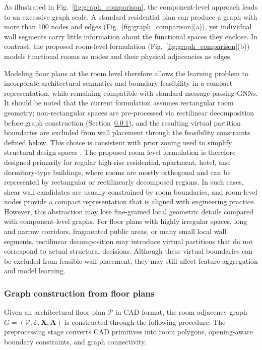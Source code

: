 As illustrated in Fig.~\ref{fig:graph_comparison}, the component-level approach leads to an excessive graph scale. A standard residential plan can produce a graph with more than 100 nodes and edges (Fig.~\ref{fig:graph_comparison}(a)), yet individual wall segments carry little information about the functional spaces they enclose. In contrast, the proposed room-level formulation (Fig.~\ref{fig:graph_comparison}(b)) models functional rooms as nodes and their physical adjacencies as edges.

Modeling floor plans at the room level therefore allows the learning problem to incorporate architectural semantics and boundary feasibility in a compact representation, while remaining compatible with standard message-passing GNNs.
It should be noted that the current formulation assumes rectangular room geometry; non-rectangular spaces are pre-processed via rectilinear decomposition before graph construction (Section~\ref{subsubsec:graph_construction}), and the resulting virtual partition boundaries are excluded from wall placement through the feasibility constraints defined below. This choice is consistent with prior zoning used to simplify structural design spaces \cite{Claessens_2020,Liu_2021}.
The proposed room-level formulation is therefore designed primarily for regular high-rise residential, apartment, hotel, and dormitory-type buildings, where rooms are mostly orthogonal and can be represented by rectangular or rectilinearly decomposed regions. In such cases, shear wall candidates are usually constrained by room boundaries, and room-level nodes provide a compact representation that is aligned with engineering practice. However, this abstraction may lose fine-grained local geometric details compared with component-level graphs. For floor plans with highly irregular spaces, long and narrow corridors, fragmented public areas, or many small local wall segments, rectilinear decomposition may introduce virtual partitions that do not correspond to actual structural decisions. Although these virtual boundaries can be excluded from feasible wall placement, they may still affect feature aggregation and model learning.


\subsubsection{Graph construction from floor plans}
\label{subsubsec:graph_construction}

Given an architectural floor plan $\mathcal{P}$ in CAD format, the room adjacency graph $G = (\mathcal{V}, \mathcal{E}, \mathbf{X}, \mathbf{A})$ is constructed through the following procedure. The preprocessing stage converts CAD primitives into room polygons, opening-aware boundary constraints, and graph connectivity.

